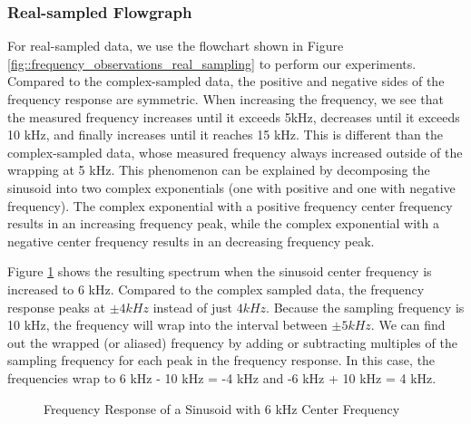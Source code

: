 \documentclass{article}
\begin{document}
\subsubsection{Real-sampled Flowgraph}

For real-sampled data, we use the flowchart shown in Figure \ref{fig::frequency_observations_real_sampling} to perform our experiments. Compared to the complex-sampled data, the positive and negative sides of the frequency response are symmetric. When increasing the frequency, we see that the measured frequency increases until it exceeds 5kHz, decreases until it exceeds 10 kHz, and finally increases until it reaches 15 kHz. This is different than the complex-sampled data, whose measured frequency always increased outside of the wrapping at 5 kHz. This phenomenon can be explained by decomposing the sinusoid into two complex exponentials (one with positive and one with negative frequency). The complex exponential with a positive frequency center frequency results in an increasing frequency peak, while the complex exponential with a negative center frequency results in an decreasing frequency peak.

Figure \ref{fig::freq_observations_real_6k_center_freq} shows the resulting spectrum when the sinusoid center frequency is increased to 6 kHz. Compared to the complex sampled data, the frequency response peaks at $\pm 4 kHz$ instead of just $4 kHz$. Because the sampling frequency is 10 kHz, the frequency will wrap into the interval between $\pm 5 kHz$. We can find out the wrapped (or aliased) frequency by adding or subtracting multiples of the sampling frequency for each peak in the frequency response. In this case, the frequencies wrap to 6 kHz - 10 kHz = -4 kHz and -6 kHz + 10 kHz = 4 kHz. 

\begin{figure}[H]
	\centerline{}
	\caption{Frequency Response of a Sinusoid with 6 kHz Center Frequency}
	\label{fig::freq_observations_real_6k_center_freq}
\end{figure}
\end{document}
